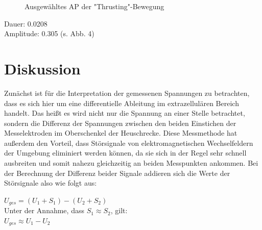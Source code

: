 \begin{figure}[H]
\caption{Ausgewähltes AP der "{}Thrusting"{}-Bewegung}
\label{thrust-ap}
\end{figure}



Dauer: 0.0208\\
Amplitude: 0.305 (s. Abb. 4)

\section{Diskussion}
Zunächst ist für die Interpretation der gemessenen Spannungen zu betrachten, dass es sich hier um eine differentielle Ableitung im extrazellulären Bereich handelt. Das heißt es wird nicht nur die Spannung an einer Stelle betrachtet, sondern die Differenz der Spannungen zwischen den beiden Einstichen der Messelektroden im Oberschenkel der Heuschrecke. Diese Messmethode hat außerdem den Vorteil, dass Störsignale von elektromagnetischen Wechselfeldern der Umgebung eliminiert werden können, da sie sich in der Regel sehr schnell ausbreiten und somit nahezu gleichzeitig an beiden Messpunkten ankommen. Bei der Berechnung der Differenz beider Signale addieren sich die Werte der Störsignale also wie folgt aus:
\begin{center}
$U_{ges}= (U_1+S_1) - (U_2 + S_2)$ \\

Unter der Annahme, dass $S_1 \approx S_2$, gilt: \\

$U_{ges} \approx U_1 - U_2$
\end{center}


